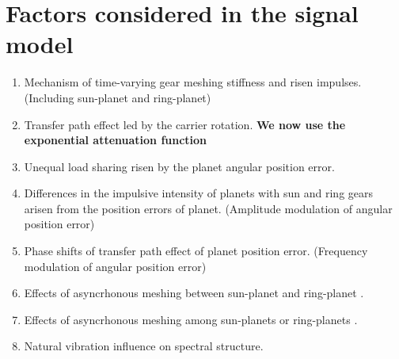 \documentclass[a4paper]{cas-sc}%
\begin{document}
\section{Factors considered in the signal model}
\begin{enumerate}
    \item Mechanism of time-varying gear meshing stiffness and risen impulses. (Including sun-planet and ring-planet)
    \item Transfer path effect led by the carrier rotation. \textbf{We now use the exponential attenuation function}
    \item Unequal load sharing risen by the planet angular position error.
    \item Differences in the impulsive intensity of planets with sun and ring gears arisen from the position errors of planet. (Amplitude modulation of angular position error)
    \item Phase shifts of transfer path effect of planet position error. (Frequency modulation of angular position error)
    \item Effects of asyncrhonous meshing between sun-planet and ring-planet \cite{Parker2004}.
    \item Effects of asyncrhonous meshing among sun-planets or ring-planets \cite{Inalpolat2009}.
    \item Natural vibration influence on spectral structure.
\end{enumerate}



\end{document}

